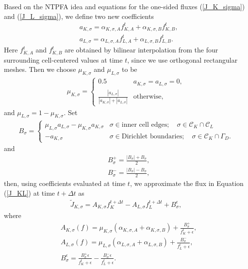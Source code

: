 \documentclass[11pt]{article}
\begin{document}
Based on the NTPFA idea and equations for the one-sided fluxes (\ref{J_K_sigma}) and (\ref{J_L_sigma}), we define two new coefficients 
  \begin{align}
          &a_{K,\sigma} = \alpha_{K,\sigma,A}f_{K,A}^{t} + \alpha_{K,\sigma,B}f_{K,B}^{t}, \\
          &a_{L,\sigma} = \alpha_{L,\sigma,A}f_{L,A}^{t} + \alpha_{L,\sigma,B}f_{L,B}^{t}.
  \end{align}
Here $f_{K,A}^t$ and $f_{K,B}^t$ are obtained by bilinear interpolation
from the four surrounding cell-centered values at time $t$, since we use
orthogonal rectangular meshes. Then we choose $\mu_{K,\sigma}$ and $\mu_{L,\sigma}$ to be
  \begin{align}
    \mu_{K,\sigma} = \begin{cases}
      0.5 & a_{K,\sigma} = a_{L,\sigma} = 0, \\
      \displaystyle \frac{|a_{L,\sigma}|}{|a_{K,\sigma}| + |a_{L,\sigma}|} & \text{otherwise},
    \end{cases}
  \end{align}
and $\mu_{L,\sigma} = 1 - \mu_{K,\sigma}$. Set 
  \begin{align}
    B_{\sigma} = \begin{cases}
      \mu_{L,\sigma}a_{L,\sigma} - \mu_{K,\sigma}a_{K,\sigma} & \sigma \in \text{inner cell edges}; \quad \sigma \in \mathcal{C}_{K} \cap \mathcal{C}_{L} \\
      -a_{K,\sigma} & \sigma \in \text{Dirichlet boundaries}; \quad \sigma \in \mathcal{C}_{K} \cap \Gamma_{D}.
    \end{cases}
  \end{align}
and 
  \begin{align}
    &B_{\sigma}^+=\frac{|B_{\sigma}| + B_{\sigma}}{2}, \\
    &B_{\sigma}^-=\frac{|B_{\sigma}| - B_{\sigma}}{2},
  \end{align}
then, using coefficients evaluated at time $t$, we approximate the flux in
Equation (\ref{J_KL}) at time $t+\Delta t$ as
  \begin{align}
    \label{J_KL_NTPFA}
    \tilde{J}_{K,\sigma} = A_{K,\sigma} f_K^{t+\Delta t} - A_{L,\sigma} f_L^{t+\Delta t} + B_{\sigma}^{\epsilon},
  \end{align}
where
  \begin{align}
    &A_{K,\sigma}(f) = \mu_{K,\sigma}(\alpha_{K,\sigma,A} + \alpha_{K,\sigma,B}) + \frac{B_{\sigma}^+}{f_K^{t} + \epsilon}, \\
    &A_{L,\sigma}(f) = \mu_{L,\sigma}(\alpha_{L,\sigma,A} + \alpha_{L,\sigma,B}) + \frac{B_{\sigma}^-}{f_L^{t} + \epsilon}, \\
    &B_{\sigma}^{\epsilon} = \frac{B_{\sigma}^+\epsilon}{f_K^{t} + \epsilon} - \frac{B_{\sigma}^-\epsilon}{f_L^{t} + \epsilon}.
  \end{align}
\end{document}
